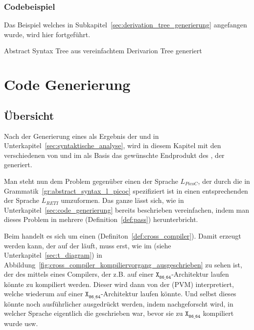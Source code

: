 \subsubsection{Codebeispiel}
Das Beispiel welches in Subkapitel~\ref{sec:derivation_tree_generierung} angefangen wurde, wird hier fortgeführt.

\begin{code}
  \centering
  \caption{Abstract Syntax Tree aus vereinfachtem Derivarion Tree generiert}
  \label{code:abstract_syntax_tree_aus_vereinfachtem_derivarion_tree_generiert}
\end{code}

\section{Code Generierung}
\subsection{Übersicht}
Nach der Generierung eines  als Ergebnis der  und  in Unterkapitel~\ref{sec:syntaktische_analyse}, wird in diesem Kapitel mit den verschiedenen  von  und  im  als Basis das gewünschte Endprodukt des , der  generiert.

Man steht nun dem Problem gegenüber einen  der Sprache $L_{PicoC}$, der durch die  in Grammatik~\ref{gr:abstract_syntax_l_picoc} spezifiziert ist in einen entsprechenden  der Sprache $L_{RETI}$ umzuformen. Das ganze lässt sich, wie in Unterkapitel~\ref{sec:code_generierung} bereits beschrieben vereinfachen, indem man dieses Problem in mehrere  (Definition~\ref{def:pass}) herunterbricht.


Beim  handelt es sich um einen  (Definiton~\ref{def:cross_compiler}). Damit  erzeugt werden kann, der auf der  läuft, muss erst, wie im  (siehe Unterkapitel~\ref{sec:t_diagram}) in Abbildung~\ref{fig:cross_compiler_kompiliervorgang_ausgeschrieben} zu sehen ist, der  des  mittels eines Compilers, der z.B. auf einer $\mathtt{X_{86\_64}}$-Architektur laufen könnte zu  kompiliert werden. Dieser  wird dann von der  (PVM) interpretiert, welche wiederum auf einer $\mathtt{X_{86\_64}}$-Architektur laufen könnte. Und selbst dieses  könnte noch ausführlicher ausgedrückt werden, indem nachgeforscht wird, in welcher Sprache eigentlich die  geschrieben war, bevor sie zu $\mathtt{X_{86\_64}}$ kompiliert wurde usw.


